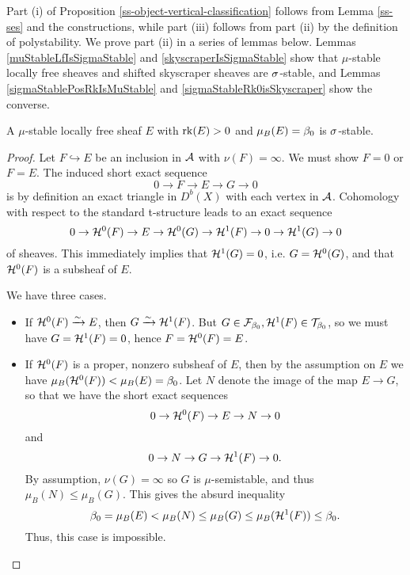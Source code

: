 Part (i) of Proposition \ref{ss-object-vertical-classification} follows from Lemma \ref{ss-ses} and the constructions, while part (iii) follows from part (ii) by the definition of polystability. We prove part (ii)
in a series of lemmas below. Lemmas \ref{muStableLfIsSigmaStable} and \ref{skyscraperIsSigmaStable} show that $\mu$-stable locally free sheaves and shifted skyscraper sheaves are $\sigma$-stable, and Lemmas \ref{sigmaStablePosRkIsMuStable} and \ref{sigmaStableRk0isSkyscraper} show the converse.
\begin{lem}\label{muStableLfIsSigmaStable}
    A $\mu$-stable locally free sheaf $E$ with $\operatorname{\mathrm{rk}}(E) > 0$ and $\mu_B(E) = \beta_0$ is $\sigma$-stable.
\end{lem}
\begin{proof}
    Let $F \hookrightarrow E$ be an inclusion in $\mathcal{A}$ with $\nu(F) = \infty$. We must show $F = 0$ or $F = E$. The induced short exact sequence
    \[ 0 \to F \to E \to G \to 0 \]
    is by definition an exact triangle in $D^b(X)$ with each vertex in $\mathcal{A}$. Cohomology with respect to the standard t-structure leads to an exact sequence
    \[ 0 \to \mathcal{H}^0(F) \to E \to \mathcal{H}^0(G) \to \mathcal{H}^1(F) \to 0 \to \mathcal{H}^1(G) \to 0 \]
    of sheaves. This immediately implies that $\mathcal{H}^1(G) = 0$, i.e. $G = \mathcal{H}^0(G)$, and that $\mathcal{H}^0(F)$ is a subsheaf of $E$.
    
    We have three cases.
    \begin{itemize}
        \item If $\mathcal{H}^0(F) \xrightarrow{\sim} E$, then $G \xrightarrow{\sim} \mathcal{H}^1(F)$. But $G \in \mathcal{F}_{\beta_0}, \mathcal{H}^1(F) \in \mathcal{T}_{\beta_0}$, so we must have $G = \mathcal{H}^1(F) = 0$, hence $F = \mathcal{H}^0(F) = E$.
        
        \item If $\mathcal{H}^0(F)$ is a proper, nonzero subsheaf of $E$, then by the assumption on $E$ we have $\mu_B(\mathcal{H}^0(F)) < \mu_B(E) = \beta_0$. Let $N$ denote the image of the map $E \to G$, so that we have the short exact sequences
        \[ 0 \to \mathcal{H}^0(F) \to E \to N \to 0 \]
        and 
        \[ 0 \to N \to G \to \mathcal{H}^1(F) \to 0. \]
        By assumption, $\nu(G) = \infty$ so $G$ is $\mu$-semistable, and thus $\mu_B(N) \le \mu_B(G)$. This gives the absurd inequality 
        \[ \beta_0 = \mu_B(E) < \mu_B(N) \le \mu_B(G) \le \mu_B(\mathcal{H}^1(F)) \le \beta_0. \]
        Thus, this case is impossible.
        

\end{itemize}
\end{proof}
